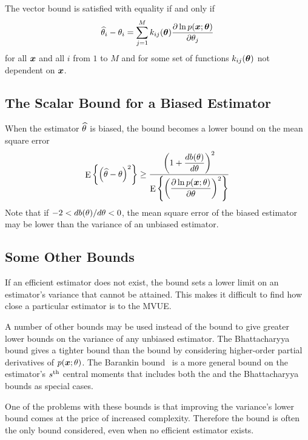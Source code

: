 The vector \CR bound is satisfied with equality if and only if 
\begin{equation}
\widehat{\theta}_{i}-\theta_{i}=\sum_{j=1}^M k_{ij}(\bm{\theta})\frac{{\partial}\ln p(\bm{x};\bm{\theta})}{{\partial}
\theta_{j}}
\end{equation}
for all $\bm{x}$ and all $i$ from $1$ to $M$ and for some set of functions 
$k_{ij}(\bm{\theta})$ not dependent on $\bm{x}$.


\subsection{The Scalar \CR Bound for a Biased Estimator}

When the estimator $\widehat{\theta}$ is biased, the \CR bound becomes a lower bound 
on the mean square error
\begin{equation}
{\mathop{\rm E}\nolimits\left\{\left(\widehat{\theta}-\theta\right)^2\right\}}\geq 
\frac{\displaystyle\left(1+\frac{db(\theta)}{d\theta}\right)^2}
{\displaystyle{\mathop{\rm E}\nolimits\left\{\left(\frac{{\partial}\ln p(\bm{x};\theta)}{{\partial}\theta}\right)^2\right\}}}
\end{equation}
Note that if $-2<db(\theta)/d\theta<0$, the mean square error of the 
biased estimator may be lower than the variance of an unbiased estimator.

\subsection{Some Other Bounds}

If an efficient estimator does not exist, the \CR bound sets a lower limit
on an estimator's variance that cannot be attained.  This makes it difficult
to find how close a particular estimator is to the MVUE.

A number of other bounds may be used instead of the \CR bound to give
greater lower bounds on the variance of any unbiased estimator.  The
Bhattacharyya bound \cite{Bha46,Bha47,Bha48} gives a tighter bound than the
\CR bound by considering higher-order partial derivatives of $p(\bm{x};\theta)$.
The Barankin bound~\cite{Bar49} is a more general bound on the estimator's
$s^{\rm th}$ central moments that includes both the \CR and the Bhattacharyya
bounds as special cases.

One of the problems with these bounds is that improving the variance's 
lower bound comes at the price of increased complexity.  Therefore the \CR
bound is often the only bound considered, even when no efficient estimator
exists.

